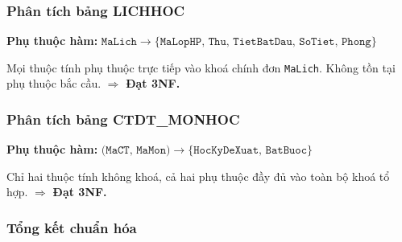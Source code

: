 \documentclass[13pt, a4paper]{article}
\begin{document}
\subsubsection{Phân tích bảng LICHHOC}
\textbf{Phụ thuộc hàm:} $\texttt{MaLich} \to \{\texttt{MaLopHP, Thu, TietBatDau, SoTiet, Phong}\}$

\noindent Mọi thuộc tính phụ thuộc trực tiếp vào khoá chính đơn \texttt{MaLich}. Không tồn tại phụ thuộc bắc cầu. $\Rightarrow$ \textbf{Đạt 3NF.}

\subsubsection{Phân tích bảng CTDT\_MONHOC}
\textbf{Phụ thuộc hàm:} $\texttt{(MaCT, MaMon)} \to \{\texttt{HocKyDeXuat, BatBuoc}\}$

\noindent Chỉ hai thuộc tính không khoá, cả hai phụ thuộc đầy đủ vào toàn bộ khoá tổ hợp. $\Rightarrow$ \textbf{Đạt 3NF.}

\subsubsection{Tổng kết chuẩn hóa}
\end{document}
